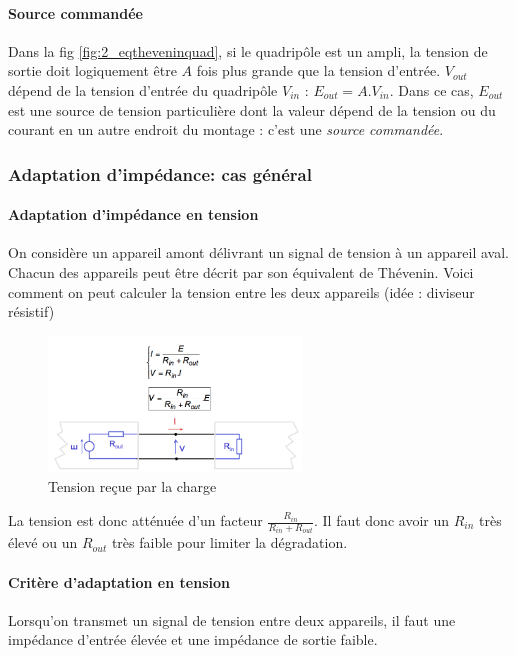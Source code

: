 \documentclass[a4paper]{article}
\begin{document}
    \paragraph{Source commandée} Dans la fig \ref{fig:2_eqtheveninquad}, si le 
    quadripôle est un ampli, la tension de sortie doit logiquement être $A$ fois
    plus grande que la tension d'entrée. $V_{out}$ dépend de la tension d'entrée
    du quadripôle $V_{in}$ : $E_{out} = A . V_{in}$. Dans ce cas, $E_{out}$ est une 
    source de tension particulière dont la valeur dépend de la tension ou du courant
    en un autre endroit du montage : c'est une \textit{source commandée}.

    \subsubsection{Adaptation d'impédance: cas général}
    \paragraph{Adaptation d'impédance en tension} On considère un appareil amont
    délivrant un signal de tension à un appareil aval. Chacun des appareils
    peut être décrit par son équivalent de Thévenin. Voici comment on peut 
    calculer la tension entre les deux appareils (idée : diviseur résistif)

    \begin{figure}[H]
        \begin{center}
            \includegraphics[width=0.6\textwidth]{fig/2_adaptimpedtension.png}
            \caption{Tension reçue par la charge}
            \label{fig:2_adaptimpedtension}
        \end{center}
    \end{figure}

    La tension est donc atténuée d'un facteur $\frac{R_{in}}{R_{in}+R_{out}}$. 
    Il faut donc avoir un $R_{in}$ très élevé ou un $R_{out}$ très faible
    pour limiter la dégradation.

    \paragraph{Critère d'adaptation en tension} Lorsqu'on transmet un signal
    de tension entre deux appareils, il faut une impédance d'entrée élevée
    et une impédance de sortie faible.
\end{document}
